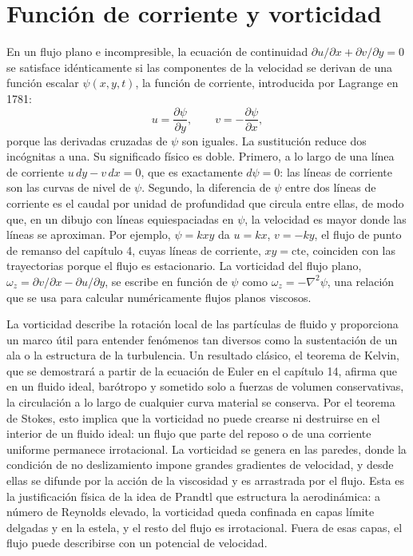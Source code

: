 \documentclass[10pt,openany]{book}
\begin{document}
\section{Función de corriente y vorticidad}

En un flujo plano e incompresible, la ecuación de continuidad \(\partial u/\partial x + \partial v/\partial y = 0\) se satisface idénticamente si las componentes de la velocidad se derivan de una función escalar \(\psi(x, y, t)\), la función de corriente, introducida por Lagrange en 1781:
\begin{equation}
u = \frac{\partial\psi}{\partial y}, \qquad v = -\frac{\partial\psi}{\partial x}, \label{eq:c12-psi}
\end{equation}
porque las derivadas cruzadas de \(\psi\) son iguales. La sustitución reduce dos incógnitas a una. Su significado físico es doble. Primero, a lo largo de una línea de corriente \(u\,dy - v\,dx = 0\), que es exactamente \(d\psi = 0\): las líneas de corriente son las curvas de nivel de \(\psi\). Segundo, la diferencia de \(\psi\) entre dos líneas de corriente es el caudal por unidad de profundidad que circula entre ellas, de modo que, en un dibujo con líneas equiespaciadas en \(\psi\), la velocidad es mayor donde las líneas se aproximan. Por ejemplo, \(\psi = kxy\) da \(u = kx\), \(v = -ky\), el flujo de punto de remanso del capítulo 4, cuyas líneas de corriente, \(xy = \mathrm{cte}\), coinciden con las trayectorias porque el flujo es estacionario. La vorticidad del flujo plano, \(\omega_z = \partial v/\partial x - \partial u/\partial y\), se escribe en función de \(\psi\) como \(\omega_z = -\nabla^{2}\psi\), una relación que se usa para calcular numéricamente flujos planos viscosos.

La vorticidad describe la rotación local de las partículas de fluido y proporciona un marco útil para entender fenómenos tan diversos como la sustentación de un ala o la estructura de la turbulencia. Un resultado clásico, el teorema de Kelvin, que se demostrará a partir de la ecuación de Euler en el capítulo 14, afirma que en un fluido ideal, barótropo y sometido solo a fuerzas de volumen conservativas, la circulación a lo largo de cualquier curva material se conserva. Por el teorema de Stokes, esto implica que la vorticidad no puede crearse ni destruirse en el interior de un fluido ideal: un flujo que parte del reposo o de una corriente uniforme permanece irrotacional. La vorticidad se genera en las paredes, donde la condición de no deslizamiento impone grandes gradientes de velocidad, y desde ellas se difunde por la acción de la viscosidad y es arrastrada por el flujo. Esta es la justificación física de la idea de Prandtl que estructura la aerodinámica: a número de Reynolds elevado, la vorticidad queda confinada en capas límite delgadas y en la estela, y el resto del flujo es irrotacional. Fuera de esas capas, el flujo puede describirse con un potencial de velocidad.
\end{document}
